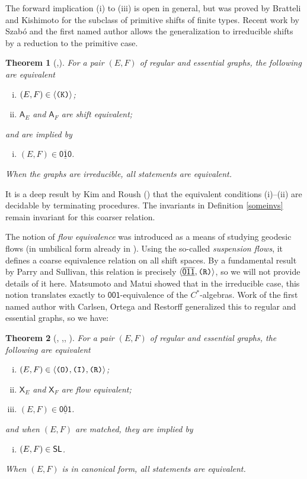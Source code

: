 \documentclass[12pt]{amsbook}%
\newcommand{\XX}[1]{\mathsf X_{#1}}
\newtheorem{theor}{Theorem}[section]
\theoremstyle{defin}
\theoremstyle{remark}
\numberwithin{equation}{chapter}
\numberwithin{theor}{section}
\newcommand{\xyz}[1]{\mbox{$\mathsf{#1}$}}
\newcommand{\xyzrel}[1]{\mbox{$\overline{\underline{\mathsf{ #1}}}$}}
\newcommand{\III}{\mbox{\texttt{\textup{(I)}}}}
\newcommand{\OOO}{\mbox{\texttt{\textup{(O)}}}}
\newcommand{\RRR}{\mbox{\texttt{\textup{(R)}}}}
\newcommand{\KKK}{\mbox{\texttt{\textup{(K)}}}}
\newcommand{\SL}{{\sf SL}}
\begin{document}
The forward implication (i) to (iii) is open in general, but was proved by Bratteli and Kishimoto for the subclass of primitive shifts of finite types. Recent work by Szab\'o and the first named author allows the generalization to irreducible shifts by a reduction to the primitive case.

  
   \begin{theor}[\cite{obak:tsacsa},\cite{segs}]\label{KBKES}
  For a pair $(E,F)$ of regular and essential graphs, the following are equivalent
  \begin{enumerate}[(i)]
\item $(E,F)\in\langle \KKK\rangle$;
  \item $\mathsf{A}_E$ and $\mathsf{A}_F$ are shift equivalent;
  \end{enumerate}
  and are implied by 
  \begin{enumerate}[(i)]\addtocounter{enumi}{2}
  \item $(E,F)\in\xyzrel{010}$.
    \end{enumerate}
    When the graphs are irreducible, all statements are equivalent.
  \end{theor}
  
It is a deep result by Kim and Roush (\cite{khkfwr:dse}) that the equivalent conditions (i)--(ii) are decidable by terminating procedures. The invariants in Definition \ref{someinvs} remain invariant for this coarser relation.

The notion of \emph{flow equivalence} was introduced as a means of studying geodesic flows (in umbilical form already in \cite{mmgah:sd}). Using the so-called \emph{suspension flows}, it defines a coarse equivalence relation on all shift spaces. By 
a fundamental result by Parry and Sullivan, this relation is precisely $\langle\xyzrel{011},\RRR\rangle$, so we will not provide details of it here. Matsumoto and Matui  showed that in the irreducible case, this notion translates exactly to \xyz{001}-equivalence of the $C^*$-algebras. Work of the first named author with Carlsen, Ortega and Restorff generalized this to regular and essential graphs, so we have:

   \begin{theor}[\cite{bpds:tifos}, \cite{kmhm:coetmscka},\cite{ceor:coe}, \cite{mbdh:pbeim}]\label{PSMMCEOR}
  For a pair $(E,F)$ of regular and essential graphs, the following are equivalent
  \begin{enumerate}[(i)]
\item $(E,F)\in\langle \OOO,\III,\RRR\rangle$;  
  \item $\XX E$ and $\XX F$ are flow equivalent;
  \item $(E,F)\in\xyzrel{001}$.
    \end{enumerate}
and when $(E,F)$ are matched, they  are  implied by 
    \begin{enumerate}[(i)]\addtocounter{enumi}{3}
  \item $(E,F)\in\SL$.
  \end{enumerate}
When $(E,F)$ is in canonical form, all statements are equivalent.
  \end{theor}
  
\end{document}

